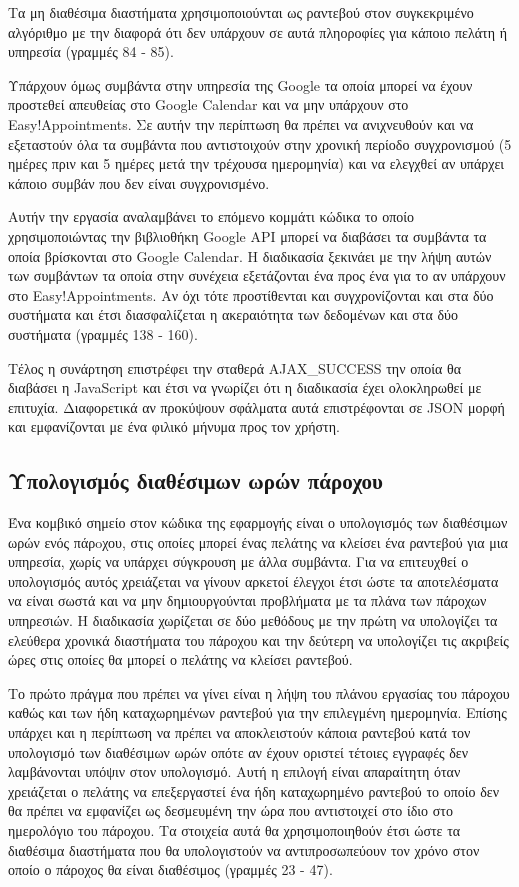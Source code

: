 Τα μη διαθέσιμα διαστήματα χρησιμοποιούνται ως ραντεβού στον συγκεκριμένο αλγόριθμο με την διαφορά ότι δεν υπάρχουν σε αυτά πληοροφίες για κάποιο πελάτη ή υπηρεσία (γραμμές 84 - 85).

Υπάρχουν όμως συμβάντα στην υπηρεσία της Google τα οποία μπορεί να έχουν προστεθεί απευθείας στο Google Calendar και να μην υπάρχουν στο Easy!Appointments. Σε αυτήν την περίπτωση θα πρέπει να ανιχνευθούν και να εξεταστούν όλα τα συμβάντα που αντιστοιχούν στην χρονική περίοδο συγχρονισμού (5 ημέρες πριν και 5 ημέρες μετά την τρέχουσα ημερομηνία) και να ελεγχθεί αν υπάρχει κάποιο συμβάν που δεν είναι συγχρονισμένο. 

Αυτήν την εργασία αναλαμβάνει το επόμενο κομμάτι κώδικα το οποίο χρησιμοποιώντας την βιβλιοθήκη Google API μπορεί να διαβάσει τα συμβάντα τα οποία βρίσκονται στο Google Calendar. Η διαδικασία ξεκινάει με την λήψη αυτών των συμβάντων τα οποία στην συνέχεια εξετάζονται ένα προς ένα για το αν υπάρχουν στο Easy!Appointments. Αν όχι τότε προστίθενται και συγχρονίζονται και στα δύο συστήματα και έτσι διασφαλίζεται η ακεραιότητα των δεδομένων και στα δύο συστήματα (γραμμές 138 - 160). 

Τέλος η συνάρτηση επιστρέφει την σταθερά AJAX\_SUCCESS την οποία θα διαβάσει η JavaScript και έτσι να γνωρίζει ότι η διαδικασία έχει ολοκληρωθεί με επιτυχία. Διαφορετικά αν προκύψουν σφάλματα αυτά επιστρέφονται σε JSON μορφή και εμφανίζονται με ένα φιλικό μήνυμα προς τον χρήστη.

\subsection{Υπολογισμός διαθέσιμων ωρών πάροχου}
Ένα κομβικό σημείο στον κώδικα της εφαρμογής είναι ο υπολογισμός των διαθέσιμων ωρών ενός πάρoχου, στις οποίες μπορεί ένας πελάτης να κλείσει ένα ραντεβού για μια υπηρεσία, χωρίς να υπάρχει σύγκρουση με άλλα συμβάντα. Για να επιτευχθεί ο υπολογισμός αυτός χρειάζεται να γίνουν αρκετοί έλεγχοι έτσι ώστε τα αποτελέσματα να είναι σωστά και να μην δημιουργούνται προβλήματα με τα πλάνα των πάροχων υπηρεσιών. Η διαδικασία χωρίζεται σε δύο μεθόδους με την πρώτη να υπολογίζει τα ελεύθερα χρονικά διαστήματα του πάροχου και την δεύτερη να υπολογίζει τις ακριβείς ώρες στις οποίες θα μπορεί ο πελάτης να κλείσει ραντεβού.



Το πρώτο πράγμα που πρέπει να γίνει είναι η λήψη του πλάνου εργασίας του πάροχου καθώς και των ήδη καταχωρημένων ραντεβού για την επιλεγμένη ημερομηνία. Επίσης υπάρχει και η περίπτωση να πρέπει να αποκλειστούν κάποια ραντεβού κατά τον υπολογισμό των διαθέσιμων ωρών οπότε αν έχουν οριστεί τέτοιες εγγραφές δεν λαμβάνονται υπόψιν στον υπολογισμό. Αυτή η επιλογή είναι απαραίτητη όταν χρειάζεται ο πελάτης να επεξεργαστεί ένα ήδη καταχωρημένο ραντεβού το οποίο δεν θα πρέπει να εμφανίζει ως δεσμευμένη την ώρα που αντιστοιχεί στο ίδιο στο ημερολόγιο του πάροχου. Τα στοιχεία αυτά θα χρησιμοποιηθούν έτσι ώστε τα διαθέσιμα διαστήματα που θα υπολογιστούν να αντιπροσωπεύουν τον χρόνο στον οποίο ο πάροχος θα είναι διαθέσιμος (γραμμές 23 - 47).

